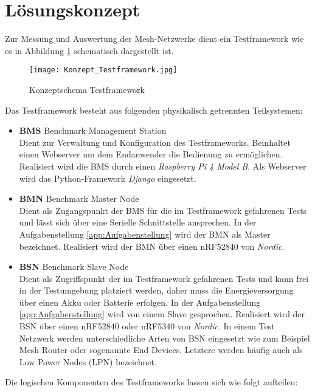 \clearpage
\section{Lösungskonzept}\label{sec:Loesungskonzept}
Zur Messung und Auswertung der Mesh-Netzwerke dient ein Testframework wie es in Abbildung \ref{fig:KonzeptschemaTestframework} schematisch dargestellt ist.

\begin{figure}[H]
	\centering
	\texttt{[image: Konzept\_Testframework.jpg]}
	\caption{Konzeptschema Testframework}\label{fig:KonzeptschemaTestframework}
\end{figure}


Das Testframework besteht aus folgenden physikalisch getrennten Teilsystemen:

\begin{itemize}
	\item \textbf{BMS} Benchmark Management Station \\ 
	Dient zur Verwaltung und Konfiguration des Testframeworks. Beinhaltet einen Webserver um dem Endanwender die Bedienung zu ermöglichen. Realisiert wird die BMS durch einen \textit{Raspberry Pi 4 Model B}. Als Webserver wird das Python-Framework \textit{Django} eingesetzt. 
	\item \textbf{BMN} Benchmark Master Node \\ 
	Dient als Zugangspunkt der BMS für die im Testframework gefahrenen Tests und lässt sich über eine Serielle Schnittstelle ansprechen. In der Aufgabenstellung \ref{app:Aufgabenstellung} wird der BMN als Master bezeichnet. Realisiert wird der BMN über einen nRF52840 von \textit{Nordic}. 
	\item \textbf{BSN} Benchmark Slave Node \\ 
	Dient als Zugriffspunkt der im Testframework gefahrenen Tests und kann frei in der Testumgebung platziert werden, daher muss die Energieversorgung über einen Akku oder Batterie erfolgen. In der Aufgabenstellung  \ref{app:Aufgabenstellung} wird von einem Slave gesprochen. Realisiert wird der BSN über einen nRF52840 oder nRF5340 von \textit{Nordic}. In einem Test Netzwerk werden unterschiedliche Arten von BSN eingesetzt wie zum Beispiel Mesh Router oder sogenannte End Devices. Letztere werden häufig auch als Low Power Nodes (LPN) bezeichnet.
\end{itemize}

Die logischen Komponenten des Testframeworks lassen sich wie folgt aufteilen:

